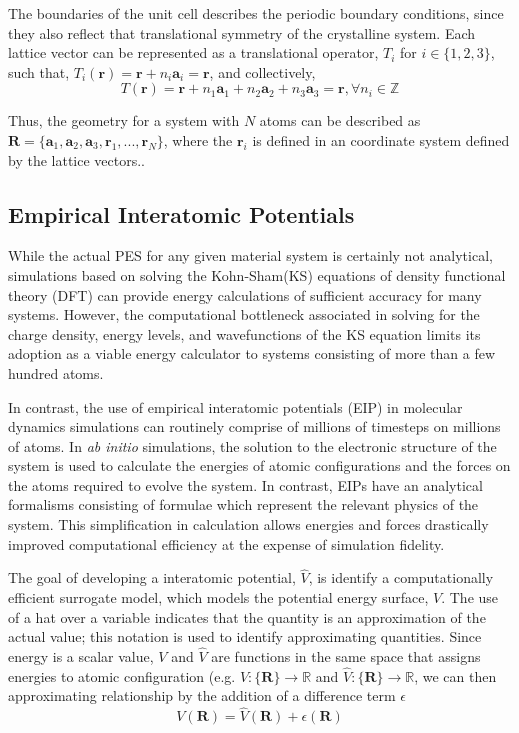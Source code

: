 The boundaries of the unit cell describes the periodic boundary conditions, since they also reflect that translational symmetry of the crystalline system.
Each lattice vector can be represented as a translational operator, $T_i$ for ${i\in\{1,2,3\}}$, such that, $T_i(\bm{r})=\bm{r} + n_i \bm{a}_i = \bm{r}$, and collectively,
\begin{equation}
    T(\bm{r}) = \bm{r}
		    + n_1 \bm{a}_1
		    + n_2 \bm{a}_2
		    + n_3 \bm{a}_3 = \bm{r}, \forall n_i \in \mathbb{Z}
\end{equation}

Thus, the geometry for a system with $N$ atoms can be described as
	$\bm{R} = \{\bm{a}_1,\bm{a}_2,\bm{a}_3,\bm{r}_1,...,\bm{r}_N\}$,
	where the $\bm{r}_i$ is defined in an coordinate system defined by the lattice vectors..
\subsection{Empirical Interatomic Potentials}

While the actual PES for any given material system is certainly not analytical, simulations based on solving the Kohn-Sham(KS) equations of density functional theory (DFT) can provide energy calculations of sufficient accuracy for many systems.  However, the computational bottleneck associated in solving for the charge density, energy levels, and wavefunctions of the KS equation limits its adoption as a viable energy calculator to systems consisting of more than a few hundred atoms.

In contrast, the use of empirical interatomic potentials (EIP) in molecular dynamics simulations can routinely comprise of millions of timesteps on millions of atoms.  In \emph{ab initio} simulations, the solution to the electronic structure of the system is used to calculate the energies of atomic configurations and the forces on the atoms required to evolve the system. In contrast, EIPs have an analytical formalisms consisting of formulae which represent the relevant physics of the system.  This simplification in calculation allows energies and forces drastically improved computational efficiency at the expense of simulation fidelity.

The goal of developing a interatomic potential, $\hat{V}$, is identify a computationally efficient surrogate model, which models the potential energy surface, $V$.  The use of a hat over a variable indicates that the quantity is an approximation of the actual value; this notation is used to identify approximating quantities.
Since energy is a scalar value, $V$ and $\hat{V}$ are functions in the same space that assigns energies to atomic configuration (e.g. ${V:\{\bm{R}\}\rightarrow \mathbb{R}}$ and ${\hat{V}:\{\bm{R}\} \rightarrow \mathbb{R}}$, we can then approximating relationship by the addition of a difference term $\epsilon$
\begin{equation}\label{eq:pes_approximation}
    V(\bm{R}) = \hat{V}(\bm{R}) + \epsilon(\bm{R})
\end{equation}

